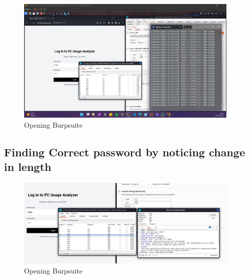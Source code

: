 \documentclass[11pt]{article}
\begin{document}
\begin{figure}[H]
    \centering
    \includegraphics[width=0.95\textwidth]{burpsuite (10).png}
    \caption{Opening Burpsuite}
    \label{fig:1}
\end{figure}
\subsection{Finding Correct password by noticing change in length}




\begin{figure}[H]
    \centering
    \includegraphics[width=0.95\textwidth]{burpsuite (11).png}
    \caption{Opening Burpsuite}
    \label{fig:1}
\end{figure}
\end{document}
